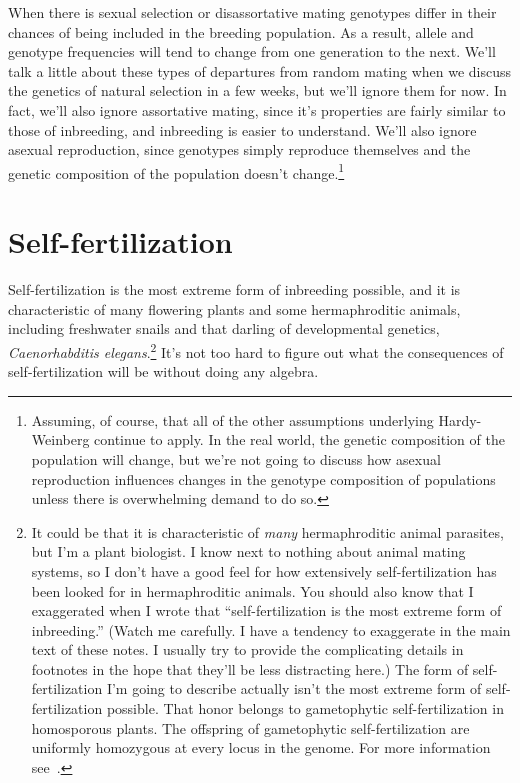 When there is sexual selection or disassortative mating genotypes
differ in their chances of being included in the breeding
population. As a result, allele and genotype frequencies will tend to
change from one generation to the next. We'll talk a little about
these types of departures from random mating when we discuss the
genetics of natural selection in a few weeks, but we'll ignore them
for now. In fact, we'll also ignore assortative mating, since it's
properties are fairly similar to those of inbreeding, and inbreeding
is easier to understand. We'll also ignore asexual reproduction, since
genotypes simply reproduce themselves and the genetic composition of
the population doesn't change.\footnote{Assuming, of course, that all
  of the other assumptions underlying Hardy-Weinberg continue to
  apply. In the real world, the genetic composition of the population
  will change, but we're not going to discuss how asexual reproduction
  influences changes in the genotype composition of populations unless
  there is overwhelming demand to do so.}

\section*{Self-fertilization}

Self-fertilization is the most extreme form of inbreeding
possible,
and it is characteristic of many flowering plants and some
hermaphroditic animals, including freshwater snails and that darling
of developmental genetics, {\it Caenorhabditis elegans}.\footnote{It
  could be that it is characteristic of {\it many\/} hermaphroditic
  animal parasites, but I'm a plant biologist. I know next to nothing
  about animal mating systems, so I don't have a good feel for how
  extensively self-fertilization has been looked for in hermaphroditic
  animals. You should also know that I exaggerated when I wrote that
  ``self-fertilization is the most extreme form of inbreeding.''
  (Watch me carefully. I have a tendency to exaggerate in the main
  text of these notes. I usually try to provide the complicating
  details in footnotes in the hope that they'll be less distracting
  here.) The form of self-fertilization I'm going to describe actually
  isn't the most extreme form of self-fertilization possible. That
  honor belongs to gametophytic self-fertilization in homosporous
  plants. The offspring of gametophytic self-fertilization are
  uniformly homozygous at every locus in the genome. For more
  information see~\cite{Holsinger-1990}.} It's not too hard to figure
out what the consequences of self-fertilization will be without doing
any algebra.

